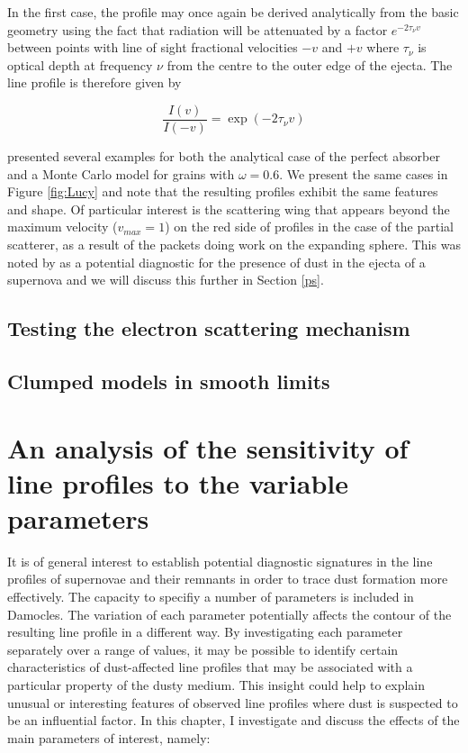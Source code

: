 In the first case, the profile may once again be derived analytically from 
the basic geometry using the fact that radiation will be attenuated by a 
factor $e^{-2\tau_{\nu} v}$ between points with line of sight fractional velocities $-v$ and 
$+v$ where $\tau_{\nu}$ is optical depth at frequency $\nu$ from the centre to the outer edge of the ejecta.  The line profile is therefore given by

\begin{equation}
\frac{I(v)}{I(-v)} = \exp(-2\tau_{\nu} v)  
\end{equation}

\citet{Lucy1989} presented several examples for both the analytical case of 
the perfect absorber and a Monte Carlo model for grains with $\omega 
=0.6$.  We present the same cases in Figure \ref{fig:Lucy} and note that 
the resulting profiles exhibit the same features and shape. Of particular 
interest is the scattering wing that appears beyond the maximum velocity 
($v_{max}=1$) on the red side of profiles in the case of the partial 
scatterer, as a result of the packets doing work on the expanding sphere.  
This was noted by \citet{Lucy1989} as a potential diagnostic for the 
presence of dust in the ejecta of a supernova and we will discuss this 
further in Section \ref{ps}.

\subsection{Testing the electron scattering mechanism}
\subsection{Clumped models in smooth limits}


\section{An analysis of the sensitivity of line profiles to the variable parameters}
It is of general interest to establish potential diagnostic signatures in 
the line profiles of supernovae and their remnants in order to trace dust 
formation more effectively. The capacity to specifiy a number of parameters is included in Damocles.  The variation of each parameter potentially affects the contour of the resulting line profile in a different way.  By investigating each parameter separately over a range of values, it may be possible to identify certain characteristics of dust-affected line profiles that may be associated with a particular property of the dusty medium.  This insight could help to explain unusual or interesting features of observed line profiles where dust is suspected to be an influential factor.  In this chapter, I investigate and discuss the effects of the main 
parameters of interest, namely:

